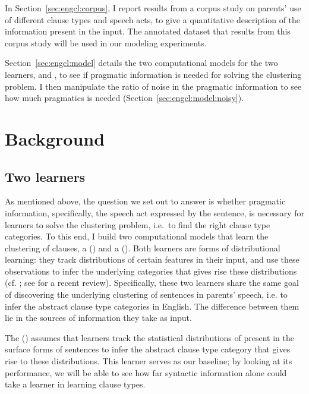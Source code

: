 In Section~\ref{sec:engcl:corpus}, I report results from a corpus study on parents' use of different clause types and speech acts, to give a quantitative description of the information present in the input. The annotated dataset that results from this corpus study will be used in our modeling experiments.

Section~\ref{sec:engcl:model} details the two computational models for the two learners, \dlearnerabbr{} and \plearnerabbr{}, to see if pragmatic information is needed for solving the clustering problem. I then manipulate the ratio of noise in the pragmatic information to see how much pragmatics is needed (Section~\ref{sec:engcl:model:noisy}). 

\section{Background}
\label{sec:engcl:background}

\subsection{Two learners} 
\label{sec:engcl:bg:learners}
As mentioned above, the question we set out to answer is whether pragmatic information, specifically, the speech act expressed by the sentence, is necessary for learners to solve the clustering problem, i.e.\ to find the right clause type categories. To this end, I build two computational models that learn the clustering of clauses, a \text{\distlearner{}} (\dlearnerabbr{}) and a \text{\praglearner{}} (\plearnerabbr{}). Both learners are forms of distributional learning: they track distributions of certain features in their input, and use these observations to infer the underlying categories that gives rise these distributions
(cf. \cite{feldman2013,gagliardi2017modeling,perkins2022vmodel,perkins2019,nguyenwilson2021}; see \cite{pearl2020review} for a recent review). Specifically, these two learners share the same goal of discovering the underlying clustering of sentences in parents' speech, i.e. to infer the abstract clause type categories in English. The difference between them lie in the sources of information they take as input. 

The \tbf{\distlearner{}} (\dlearnerabbr{}) assumes that learners track the statistical distributions of  present in the surface forms of sentences to infer the abstract clause type category that gives rise to these distributions. This learner serves as our baseline; by looking at its performance, we will be able to see how far syntactic information alone could take a learner in learning clause types. 

